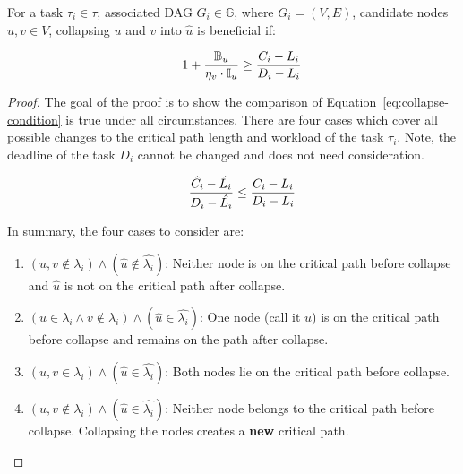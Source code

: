 \begin{theorem} \label{thm:collapse}
  For a task ${\tau_i \in \tau}$, associated DAG ${G_i \in \mathbb{G}}$,
  where ${G_i = (V, E)}$, candidate nodes ${u,v \in V}$,
  collapsing ${u}$ and ${v}$ into ${\hat{u}}$ is beneficial if:

  \begin{equation}
    \indent
    1 + \frac{\mathbb{B}_u}{\eta_v \cdot \mathbb{I}_u}
    \ge
    \frac{C_i - L_i}
         {D_i - L_i}
    \label{eq:condition}
  \end{equation}

  \begin{proof}
    The goal of the proof is to show the comparison of
    Equation~\ref{eq:collapse-condition} is true
    under all circumstances. There are four cases which cover all
    possible changes to the critical path length and workload of the
    task ${\tau_i}$. Note, the deadline of the task ${D_i}$ cannot
    be changed and does not need consideration. 

    \begin{equation} \label{eq:collapse-condition}
      \indent
      \frac{\hat{C_i} - \hat{L_i}}
           {D_i - \hat{L_i}} \le
      \frac{C_i - L_i}
           {D_i - L_i}
    \end{equation}

    In summary, the four cases to consider are:

    \begin{enumerate}
    \item ${(u, v \not \in \lambda_i)
      \land
      (\hat{u} \not \in \hat{\lambda_i})}$:
      Neither node is on the critical path before collapse and
      ${\hat{u}}$ is not on the critical path after collapse. 
    \item ${(u \in \lambda_i \land v \not \in \lambda_i)
      \land
      (\hat{u} \in \hat{\lambda_i})}$: One node (call it ${u}$)
      is on the critical path before collapse and remains on the path
      after collapse.
    \item ${(u,v \in \lambda_i) \land
      (\hat{u} \in \hat{\lambda_i})}$: Both nodes lie
      on the critical path before collapse.
    \item ${(u,v \not \in \lambda_i) \land
      (\hat{u} \in \hat{\lambda_i})}$: Neither node
      belongs to the critical path before collapse. Collapsing the
      nodes creates a \textbf{new} critical path.
    \end{enumerate}


\end{proof}
\end{theorem}
